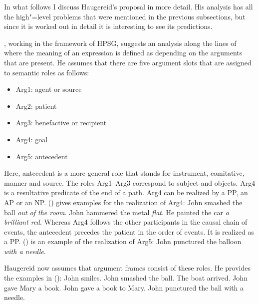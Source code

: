 \begin{exe}
\begin{xlist}[iv.]
\begin{exe}
\begin{xlist}[iv.]

In what follows I discuss Haugereid's proposal in more detail. His analysis has all the
high"=level problems that were mentioned in the previous subsections, but since it is worked out in
detail it is interesting to see its predictions.

\mbox{}\citet{Haugereid2007a}, working in the framework of HPSG, suggests an analysis along the lines of \citet{Borer2005a-u} where the meaning of an expression is defined as depending
on the arguments that are present. He assumes that there are five argument slots that are assigned to semantic roles
as follows:
\begin{itemize}
\item Arg1: agent or source
\item Arg2: patient
\item Arg3: benefactive or recipient
\item Arg4: goal
\item Arg5: antecedent
\end{itemize}
Here, antecedent is a more general role that stands for instrument, comitative, manner and source.
The roles Arg1--Arg3 correspond to subject and objects. Arg4 is a resultative predicate of the end of a path.
Arg4 can be realized by a PP, an AP or an NP. ()
gives examples for the realization of Arg4:
\eal
\ex John smashed the ball \emph{out of the room}.
\ex John hammered the metal \emph{flat}.
\ex He painted the car \emph{a brilliant red}.
\zl
Whereas Arg4 follows the other participants in the causal chain of events, the antecedent precedes the patient in the order of
events. It is realized as a PP.
() is an example of the realization of Arg5:
\ea
John punctured the balloon \emph{with a needle}.
\z

\noindent
Haugereid now assumes that argument frames consist of these roles. He provides the examples in 
():
\eal
\settowidth{}
\ex John smiles.           
\ex John smashed the ball. 
\ex The boat arrived.      
\ex John gave Mary a book. 
\ex John gave a book to Mary. 
\ex John punctured the ball with a needle. 
\zl


\end{xlist}
\end{exe}
\end{xlist}
\end{exe}

